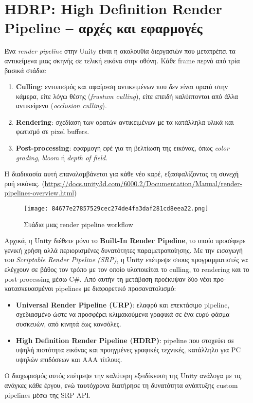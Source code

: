 \section{HDRP: High Definition Render Pipeline – αρχές και εφαρμογές}
Ένα \textit{render pipeline} στην Unity είναι η ακολουθία διεργασιών που μετατρέπει τα αντικείμενα μιας σκηνής σε τελική εικόνα στην οθόνη. Κάθε frame περνά από τρία βασικά στάδια: 
\begin{enumerate}
    \item \textbf{Culling}: εντοπισμός και αφαίρεση αντικειμένων που δεν είναι ορατά στην κάμερα, είτε λόγω θέσης (\textit{frustum culling}), είτε επειδή καλύπτονται από άλλα αντικείμενα (\textit{occlusion culling}).
    \item \textbf{Rendering}: σχεδίαση των ορατών αντικειμένων με τα κατάλληλα υλικά και φωτισμό σε pixel buffers.
    \item \textbf{Post-processing}: εφαρμογή εφέ για τη βελτίωση της εικόνας, όπως \textit{color grading}, \textit{bloom} ή \textit{depth of field}.
\end{enumerate}
Η διαδικασία αυτή επαναλαμβάνεται για κάθε νέο καρέ, εξασφαλίζοντας τη συνεχή ροή εικόνας. (\href{https://docs.unity3d.com/6000.2/Documentation/Manual/render-pipelines-overview.html}{https://docs.unity3d.com/6000.2/Documentation/Manual/render-pipelines-overview.html})


\begin{figure} [H]
    \centering
    \texttt{[image: 84677e27857529cec274de4fa3daf281cd8eea22.png]}
    \caption{Στάδια μιας render pipeline workflow}
    \label{fig:placeholder}
\end{figure}
Αρχικά, η Unity διέθετε μόνο το \textbf{Built-In Render Pipeline}, το οποίο προσέφερε γενική χρήση αλλά περιορισμένες δυνατότητες παραμετροποίησης. Με την εισαγωγή του \textit{Scriptable Render Pipeline (SRP)}, η Unity επέτρεψε στους προγραμματιστές να ελέγχουν σε βάθος τον τρόπο με τον οποίο υλοποιείται το culling, το rendering και το post-processing μέσω C\#. Από αυτήν τη μετάβαση προέκυψαν δύο νέοι προ-κατασκευασμένοι pipelines με διαφορετικό προσανατολισμό: 
\begin{itemize}
    \item \textbf{Universal Render Pipeline (URP)}: ελαφρύ και επεκτάσιμο pipeline, σχεδιασμένο ώστε να προσφέρει κλιμακούμενα γραφικά σε ένα ευρύ φάσμα συσκευών, από κινητά έως κονσόλες.
    \item \textbf{High Definition Render Pipeline (HDRP)}: pipeline που στοχεύει σε υψηλή πιστότητα εικόνας και προηγμένες γραφικές τεχνικές, κατάλληλο για PC υψηλών επιδόσεων και AAA τίτλους.
\end{itemize}
Ο διαχωρισμός αυτός επέτρεψε την καλύτερη εξειδίκευση της Unity ανάλογα με τις ανάγκες κάθε έργου, ενώ ταυτόχρονα διατήρησε τη δυνατότητα ανάπτυξης custom pipelines μέσω της SRP API. 

